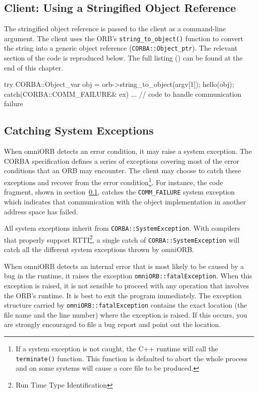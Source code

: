 \documentclass[11pt,twoside,a4paper]{book}
\newcommand{\type}[1]{\texttt{#1}}
\newcommand{\code}[1]{\texttt{#1}}
\newcommand{\op}[1]{\texttt{#1()}}
\newcommand{\file}{\begingroup \urlstyle{tt}\Url}
\begin{document}
\subsection{Client: Using a Stringified Object Reference}
\label{clnt2}

The stringified object reference is passed to the client as a
command-line argument. The client uses the ORB's
\op{string\_to\_object} function to convert the string into a generic
object reference (\type{CORBA::Object\_ptr}). The relevant section of
the code is reproduced below. The full listing (\file{eg2_clt.cc}) can
be found at the end of this chapter.

\begin{cxxlisting}
try {
  CORBA::Object_var obj = orb->string_to_object(argv[1]);
  hello(obj);
}
catch(CORBA::COMM_FAILURE& ex) {
  ... // code to handle communication failure
}
\end{cxxlisting}


\subsection{Catching System Exceptions}

When omniORB detects an error condition, it may raise a system
exception.  The CORBA specification defines a series of exceptions
covering most of the error conditions that an ORB may encounter. The
client may choose to catch these exceptions and recover from the error
condition\footnote{If a system exception is not caught, the C++
runtime will call the \op{terminate} function. This function is
defaulted to abort the whole process and on some systems will cause a
core file to be produced.}. For instance, the code fragment, shown in
section~\ref{clnt2}, catches the \code{COMM\_FAILURE} system exception
which indicates that communication with the object implementation in
another address space has failed.

All system exceptions inherit from \type{CORBA::SystemException}. With
compilers that properly support RTTI\footnote{Run Time Type
Identification}, a single catch of \code{CORBA::SystemException} will
catch all the different system exceptions thrown by omniORB.

When omniORB detects an internal error that is most likely to be
caused by a bug in the runtime, it raises the exception
\type{omniORB::fatalException}.  When this exception is raised, it is
not sensible to proceed with any operation that involves the ORB's
runtime. It is best to exit the program immediately. The exception
structure carried by \type{omniORB::fatalException} contains the exact
location (the file name and the line number) where the exception is
raised. If this occurs, you are strongly encouraged to file a bug
report and point out the location.
\end{document}
